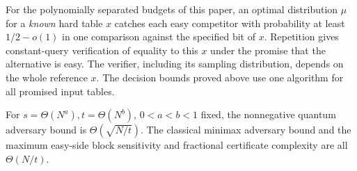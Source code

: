 For the polynomially separated budgets of this paper, an optimal distribution \(\mu\) for a \emph{known} hard table \(x\) catches each easy competitor with probability at least \(1/2-o(1)\) in one comparison against the specified bit of \(x\). Repetition gives constant-query verification of equality to this \(x\) under the promise that the alternative is easy. The verifier, including its sampling distribution, depends on the whole reference \(x\). The decision bounds proved above use one algorithm for all promised input tables.

\begin{theorem}
For \(s=\Theta(N^a), t=\Theta(N^b)\), \(0<a<b<1\) fixed, the nonnegative quantum adversary bound is \(\Theta(\sqrt{N/t})\). The classical minimax adversary bound and the maximum easy-side block sensitivity and fractional certificate complexity are all \(\Theta(N/t)\).
\end{theorem}
